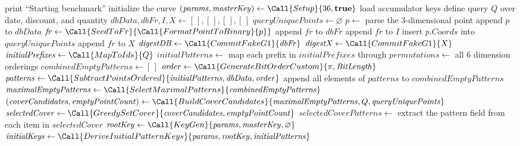 \begin{algorithm}[t]
\caption{Main benchmark pipeline}
\begin{algorithmic}[1]
    \State print ``Starting benchmark''
    \State initialize the curve
    \State $(\mathit{params}, \mathit{masterKey}) \gets \Call{Setup}{36, \textbf{true}}$
    \State load accumulator keys
    \State define query $Q$ over date, discount, and quantity
    \State $\mathit{dbData}, \mathit{dbFr}, I, X \gets [\,], [\,], [\,], [\,]$
    \State $\mathit{queryUniquePoints} \gets \varnothing$
        \State $p \gets$ parse the 3-dimensional point
        \State append $p$ to $\mathit{dbData}$
        \State $\mathit{fr} \gets \Call{SeedToFr}{\Call{FormatPointToBinary}{p}}$
        \State append $\mathit{fr}$ to $\mathit{dbFr}$
            \State append $\mathit{fr}$ to $I$
            \State insert $p.\mathit{Coords}$ into $\mathit{queryUniquePoints}$
        \Else
            \State append $\mathit{fr}$ to $X$
        \EndIf
    \EndFor
    \State $\mathit{digestDB} \gets \Call{CommitFakeG1}{\mathit{dbFr}}$
    \State $\mathit{digestX} \gets \Call{CommitFakeG1}{X}$
    \State $\mathit{initialPrefixes} \gets \Call{MapToIds}{Q}$
    \State $\mathit{initialPatterns} \gets$ map each prefix in $\mathit{initialPrefixes}$ through 
    \State $\mathit{permutations} \gets$ all 6 dimension orderings
    \State $\mathit{combinedEmptyPatterns} \gets [\,]$
        \State $\mathit{order} \gets \Call{GenerateBitOrderCustom}{\pi, \mathit{BitLength}}$
        \State $\mathit{patterns} \gets \Call{SubtractPointsOrdered}{\mathit{initialPatterns}, \mathit{dbData}, \mathit{order}}$
        \State append all elements of $\mathit{patterns}$ to $\mathit{combinedEmptyPatterns}$
    \EndFor
    \State $\mathit{maximalEmptyPatterns} \gets \Call{SelectMaximalPatterns}{\mathit{combinedEmptyPatterns}}$
    \State $(\mathit{coverCandidates}, \mathit{emptyPointCount}) \gets \Call{BuildCoverCandidates}{\mathit{maximalEmptyPatterns}, Q, \mathit{queryUniquePoints}}$
    \State $\mathit{selectedCover} \gets \Call{GreedySetCover}{\mathit{coverCandidates}, \mathit{emptyPointCount}}$
    \State $\mathit{selectedCoverPatterns} \gets$ extract the pattern field from each item in $\mathit{selectedCover}$
    \State $\mathit{rootKey} \gets \Call{KeyGen}{\mathit{params}, \mathit{masterKey}, \varnothing}$
    \State $\mathit{initialKeys} \gets \Call{DeriveInitialPatternKeys}{\mathit{params}, \mathit{rootKey}, \mathit{initialPatterns}}$

\end{algorithmic}
\end{algorithm}
